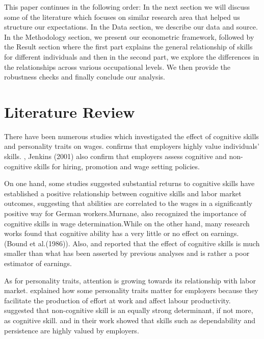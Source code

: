 \documentclass[11pt, a4paper, leqno]{article}
\begin{document}
This paper continues in the following order: In the next section we will discuss some of the literature which focuses on similar research area that helped us structure our expectations. In the Data section, we describe our data and source. In the Methodology section, we present our econometric framework, followed by the Result section where the first part explains the general relationship of skills for different individuals and then in the second part, we explore the differences in the relationships across various occupational levels. We then provide the robustness checks and finally conclude our analysis.

\section*{Literature Review}

There have been numerous studies which investigated the effect of cognitive skills and personality traits on wages.\citet{heineck} confirms that employers highly value individuals’ skills. \citet{farkas}, Jenkins (2001) also confirm that employers assess cognitive and non-cognitive skills for hiring, promotion and wage setting policies.\par

On one hand, some studies suggested substantial returns to cognitive skills \citet{heineck} have established a positive relationship between cognitive skills and labor market outcomes, suggesting that abilities are correlated to the
wages in a significantly positive way for German workers.Murnane, \citet{levy} also recognized the importance of cognitive skills in wage determination.While on the other hand, many research works found that cognitive ability has a very little  or no effect on earnings.(Bound et al.(1986)). Also, \citet{heckman} and  \citet{zax} reported that the effect of cognitive skills is much smaller than what has been asserted by previous analyses and is rather a poor estimator of earnings.\par

As for personality traits, attention is growing towards its relationship with labor market. \citet{Osborn} explained how some personality traits matter for employers because they facilitate the production of effort at work and affect labour productivity. 
\citet{Urzua} suggested that non-cognitive skill is an equally strong determinant, if not more, as cognitive skill. \citet{Gintis} and \citet{Edwards} in their work showed that skills such as dependability and persistence are highly valued by employers.\par
\end{document}
